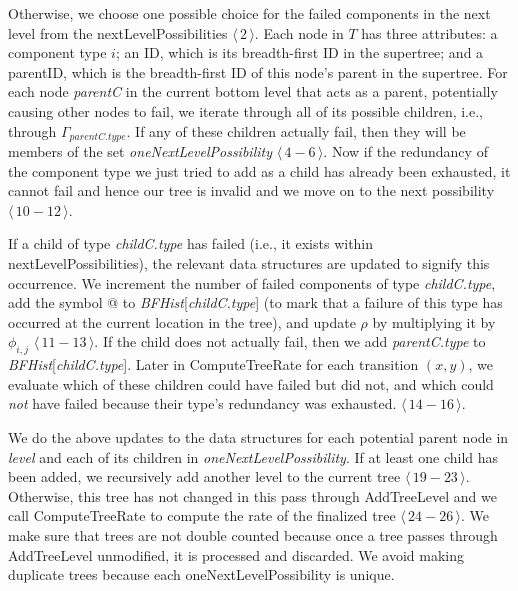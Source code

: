 \documentclass[12pt]{article}
\newcommand{\varName}[1]{\textrm{\it#1}}
\newcommand{\citeLine}[1]{$\langle \, #1 \, \rangle$}
\newcommand{\citeBlock}[2]{$\langle \, #1 - #2 \, \rangle$}
\begin{document}
Otherwise, we choose one possible choice for the failed components in the next
level from the nextLevelPossibilities \citeLine{2}. Each node in $T$ has three
attributes: a component type $i$; an ID, which is its breadth-first ID in the
supertree; and a parentID, which is the breadth-first ID of this node's parent
in the supertree. For each node \varName{parentC} in the current bottom level
that acts as a parent, potentially causing other nodes to fail, we iterate
through all of its possible children, i.e., through $\Gamma_{parentC.type}$. If
any of these children actually fail, then they will be members of the set
\varName{oneNextLevelPossibility} \citeBlock{4}{6}. Now if the redundancy of the
component type we just tried to add as a child has already been exhausted, it
cannot fail and hence our tree is invalid and we move on to the next possibility
\citeBlock{10}{12}.

If a child of type \varName{childC.type} has failed (i.e., it exists within
nextLevelPossibilities), the relevant data structures are updated to signify
this occurrence. We increment the number of failed components of type
\varName{childC.type}, add the symbol @ to
\varName{BFHist}[\varName{childC.type}] (to mark that a failure of this type has
occurred at the current location in the tree), and update $\rho$ by multiplying
it by $\phi_{i, j}$ \citeBlock{11}{13}. If the child does not actually fail,
then we add \varName{parentC.type} to \varName{BFHist}[\varName{childC.type}].
Later in ComputeTreeRate for each transition $(x, y)$, we evaluate which of
these children could have failed but did not, and which could \textit{not} have
failed because their type's redundancy was exhausted. \citeBlock{14}{16}.

We do the above updates to the data structures for each potential parent node in
\varName{level} and each of its children in \varName{oneNextLevelPossibility}.
If at least one child has been added, we recursively add another level to the
current tree \citeBlock{19}{23}. Otherwise, this tree has not changed in this
pass through \mbox{AddTreeLevel} and we call ComputeTreeRate to compute the rate
of the finalized tree \citeBlock{24}{26}. We make sure that trees are not double
counted because once a tree passes through \mbox{AddTreeLevel} unmodified, it is
processed and discarded. We avoid making duplicate trees because each
oneNextLevelPossibility is unique.
\end{document}
